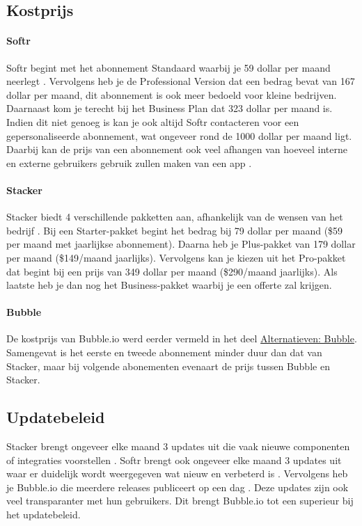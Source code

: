 \subsection{Kostprijs}%
\label{subsec:kostprijs}

\paragraph{Softr}
Softr begint met het abonnement Standaard waarbij je 59 dollar per maand neerlegt \autocite{Frater2024}
\autocite{Youssef2023}. Vervolgens heb je de Professional Version dat een bedrag bevat van 167 dollar per maand, 
dit abonnement is ook meer bedoeld voor kleine bedrijven. Daarnaast kom je terecht bij het Business Plan dat 323 dollar per maand is. 
Indien dit niet genoeg is kan je ook altijd Softr contacteren voor een gepersonaliseerde abonnement, wat ongeveer rond de 1000 dollar per maand ligt. 
Daarbij kan de prijs van een abonnement ook veel afhangen van hoeveel interne en externe gebruikers gebruik zullen maken van een app \autocite{Frater2024}.
\paragraph{Stacker}
Stacker biedt 4 verschillende pakketten aan, afhankelijk van de wensen van het bedrijf \autocite{JDN2023}
\autocite{Advice}. 
Bij een Starter-pakket begint het bedrag bij 79 dollar per maand (\$59 per maand met jaarlijkse abonnement).  
Daarna heb je Plus-pakket van 179 dollar per maand (\$149/maand jaarlijks). Vervolgens kan je kiezen uit het Pro-pakket 
dat begint bij een prijs van 349 dollar per maand (\$290/maand jaarlijks). Als laatste heb je dan nog het Business-pakket waarbij je een offerte zal krijgen.

\paragraph{Bubble}
De kostprijs van Bubble.io werd eerder vermeld in het deel \hyperref[subsec:alternatieve-platformen]{Alternatieven: Bubble}. 
Samengevat is het eerste en tweede abonnement minder duur dan dat van Stacker, maar bij volgende abonementen evenaart de prijs tussen Bubble en Stacker.
\subsection{Updatebeleid}%
\label{subsec:updatebeleid}
Stacker brengt ongeveer elke maand 3 updates uit die vaak nieuwe componenten of integraties voorstellen \autocite{Stacker}.  
Softr brengt ook ongeveer elke maand 3 updates uit waar er duidelijk wordt weergegeven wat nieuw en verbeterd is \autocite{Softra}. 
Vervolgens heb je Bubble.io die meerdere releases publiceert op een dag \autocite{Bubble}. Deze updates zijn ook veel transparanter met hun gebruikers. 
Dit brengt Bubble.io tot een superieur bij het updatebeleid.